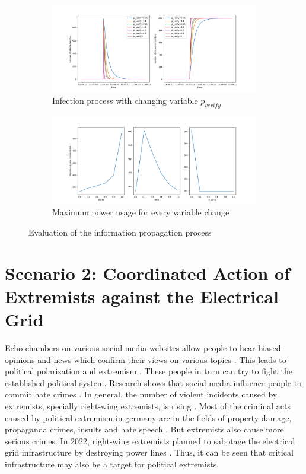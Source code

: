 \begin{figure}[ht]\ContinuedFloat
    \begin{subfigure}{\textwidth}
        \centering
        \includegraphics[scale=.5]{figs/eval/scenario1/verify_mix.png}
        \caption{Infection process with changing variable $p_{verify}$}
        \label{scen1variablepverify} 
        \end{subfigure}
        \begin{subfigure}{\textwidth}
        \centering
        \includegraphics[scale=.5]{figs/eval/scenario1/maxpower.png}
        \caption{Maximum power usage for every variable change}
        \label{scen1variablemaxpower} 
        \end{subfigure}
        \caption{Evaluation of the information propagation process}
        \label{allvalues}
\end{figure}

\section{Scenario 2: Coordinated Action of Extremists 
against the Electrical Grid}

Echo chambers on various social media websites allow people to 
hear biased opinions and news which confirm their views on 
various topics \cite{terren2021echo}. This leads to political
polarization and extremism \cite{van2022banality}.
These people in turn can try to fight the established political
system. Research shows that social media influence people
to commit hate crimes \cite{muller2021fanning}.
In general, the number of violent incidents caused by
extremists, specially right-wing extremists, is rising 
\cite{koehler2016right}. 
Most of the criminal acts caused by political extremism 
in germany are in the fields of property damage, 
propaganda crimes, insults and hate speech \cite{bmicrimestatistics}.
But extremists also cause more serious crimes. In 2022,
right-wing extremists planned to sabotage the electrical grid 
infrastructure by destroying power lines \cite{anschlagstrom}.
Thus, it can be seen that critical infrastructure may also be a target
for political extremists. 

